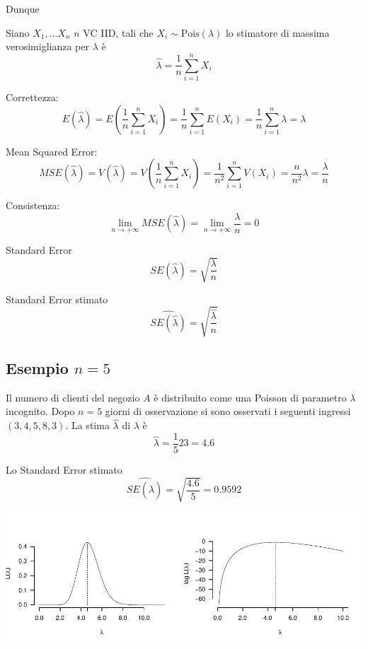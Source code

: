 \documentclass[
  11pt,
]{book}
\theoremstyle{mytheoremstyle}
\theoremstyle{mydefstyle}
\begin{document}
Dunque

\begin{info}
Siano \(X_1,...X_n\) \(n\) VC IID, tali che \(X_i\sim\text{Pois}(\lambda)\) lo stimatore
di massima verosimiglianza per \(\lambda\) è
\[\hat \lambda=\frac 1n \sum_{i=1}^nX_i\]

\end{info}

\begin{info}
Correttezza:
\[
  E(\hat\lambda) =  E\left(\frac{1}n\sum_{i=1}^n X_i\right) = \frac 1 n \sum_{i=1}^n E(X_i) = \frac 1 n \sum_{i=1}^n \lambda = \lambda
\]

\end{info}

\begin{info}
Mean Squared Error:
\[
  MSE(\hat\lambda) = V(\hat\lambda)
                   = V\left(\frac 1 n \sum_{i=1}^n X_i\right)
                 = \frac 1 {n^2} \sum_{i=1}^n V(X_i)
                 = \frac n {n^2} \lambda
                 = \frac {\lambda}n
\]

\end{info}

\begin{info}
Consistenza:
\[
  \lim_{n\to+\infty} MSE(\hat\lambda) = \lim_{n\to+\infty} \frac {\lambda}n = 0
\]

\end{info}

\begin{info}
Standard Error
\[SE(\hat\lambda)=\sqrt{\frac {\lambda}n}\]

Standard Error stimato
\[\widehat{SE(\hat\lambda)}=\sqrt{\frac {\hat\lambda}n}\]

\end{info}

\subsection{\texorpdfstring{Esempio \(n=5\)}{Esempio n=5}}\label{esempio-n5}

Il numero di clienti del negozio \(A\) è distribuito come una Poisson di parametro \(\lambda\) incognito. Dopo \(n=5\) giorni di osservazione si sono osservati i seguenti ingressi \((3, 4, 5, 8, 3)\).
La stima \(\hat\lambda\) di \(\lambda\) è
\[\hat\lambda=\frac 1 523=4.6\]

Lo Standard Error stimato
\[\widehat{SE(\hat\lambda)}=\sqrt{\frac {4.6}5}=0.9592\]

\begin{center}\includegraphics{Appunti_di_Statistica_2025_files/figure-latex/12-Verosimiglianza-20-1} \end{center}
\end{document}
